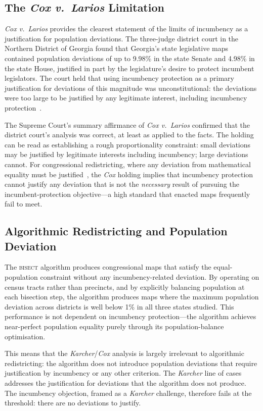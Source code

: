 \subsection{The \textit{Cox v.\ Larios} Limitation}

\textit{Cox v.\ Larios} provides the clearest statement of the limits of incumbency
as a justification for population deviations. The three-judge district court in the
Northern District of Georgia found that Georgia's state legislative maps contained
population deviations of up to 9.98\% in the state Senate and 4.98\% in the state House,
justified in part by the legislature's desire to protect incumbent legislators. The
court held that using incumbency protection as a primary justification for deviations
of this magnitude was unconstitutional: the deviations were too large to be justified
by any legitimate interest, including incumbency protection~\citep{cox2004}.

The Supreme Court's summary affirmance of \textit{Cox v.\ Larios} confirmed that
the district court's analysis was correct, at least as applied to the facts. The holding
can be read as establishing a rough proportionality constraint: small deviations may
be justified by legitimate interests including incumbency; large deviations cannot.
For congressional redistricting, where any deviation from mathematical equality must
be justified~\citep{karcher1983}, the \textit{Cox} holding implies that incumbency
protection cannot justify any deviation that is not the \textit{necessary} result of
pursuing the incumbent-protection objective---a high standard that enacted maps
frequently fail to meet.

\subsection{Algorithmic Redistricting and Population Deviation}

The \textsc{bisect} algorithm produces congressional maps that satisfy the
equal-population constraint without any incumbency-related deviation. By operating
on census tracts rather than precincts, and by explicitly balancing population at
each bisection step, the algorithm produces maps where the maximum population deviation
across districts is well below 1\% in all three states studied. This performance is
not dependent on incumbency protection---the algorithm achieves near-perfect population
equality purely through its population-balance optimisation.

This means that the \textit{Karcher}/\textit{Cox} analysis is largely irrelevant to
algorithmic redistricting: the algorithm does not introduce population deviations that
require justification by incumbency or any other criterion. The \textit{Karcher}
line of cases addresses the justification for deviations that the algorithm does not
produce. The incumbency objection, framed as a \textit{Karcher} challenge, therefore
fails at the threshold: there are no deviations to justify.

